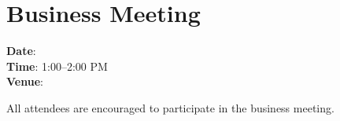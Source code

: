 \section[Business Meeting]{Business Meeting}

\textbf{Date}: \daydateyear \\
\textbf{Time}: 1:00--2:00 PM \\
\textbf{Venue}: \BusinessMeetingLoc



All attendees are encouraged to participate in the business
meeting. 


